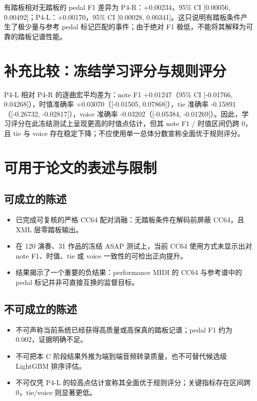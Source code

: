 \documentclass[11pt,a4paper]{ctexart}
\begin{document}
有踏板相对无踏板的 pedal F1 差异为 P4-R：+0.00234，95\% CI [0.00056, 0.00492]；P4-L：+0.00170，95\% CI [0.00028, 0.00341]。这只说明有踏板条件产生了极少量与参考 pedal 标记匹配的事件；由于绝对 F1 极低，不能将其解释为可靠的踏板记谱性能。

\section{补充比较：冻结学习评分与规则评分}
P4-L 相对 P4-R 的逐曲宏平均差为：note F1 +0.01247（95\% CI [-0.01766, 0.04268]），时值准确率 +0.03070（[-0.01505, 0.07868]），tie 准确率 -0.15891（[-0.26732, -0.02817]），voice 准确率 -0.03202（[-0.05384, -0.01269]）。因此，学习评分在此冻结测试上呈现更高的时值点估计，但其 note F1 / 时值区间仍跨 0，且 tie 与 voice 存在稳定下降；不应使用单一总体分数宣称全面优于规则评分。

\section{可用于论文的表述与限制}
\subsection{可成立的陈述}
\begin{itemize}
  \item 已完成可复核的严格 CC64 配对消融：无踏板条件在解码前屏蔽 CC64，且 XML 层零踏板输出。
  \item 在 120 演奏、31 作品的冻结 ASAP 测试上，当前 CC64 使用方式未显示出对 note F1、时值、tie 或 voice 一致性的可检出正向提升。
  \item 结果揭示了一个重要的负结果：performance MIDI 的 CC64 与参考谱中的 pedal 标记并非可直接互换的监督目标。
\end{itemize}

\subsection{不可成立的陈述}
\begin{itemize}
  \item 不可声称当前系统已经获得高质量或高保真的踏板记谱；pedal F1 约为 0.002，证据明确不足。
  \item 不可把本 C 阶段结果外推为端到端音频转录质量，也不可替代候选级 LightGBM 排序评估。
  \item 不可仅凭 P4-L 的较高点估计宣称其全面优于规则评分；关键指标存在区间跨 0，tie/voice 则显著更低。
\end{itemize}
\end{document}
